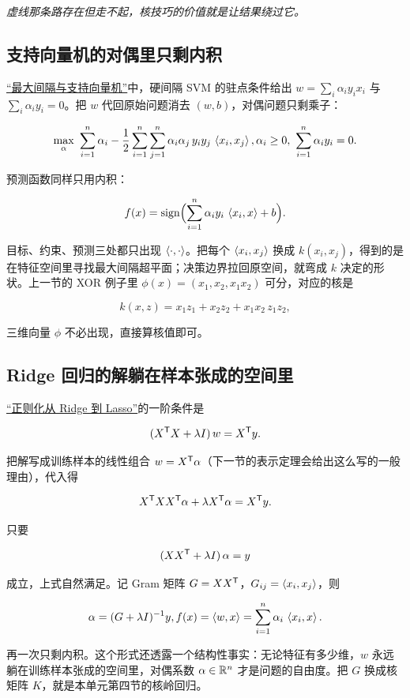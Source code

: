 \emph{虚线那条路存在但走不起，核技巧的价值就是让结果绕过它。}

\subsection{支持向量机的对偶里只剩内积}

\hyperref[sec:09-Convex-Optimization/07-Applications/03]{``最大间隔与支持向量机''}中，硬间隔 SVM 的驻点条件给出 \(w=\sum_i\alpha_iy_ix_i\) 与 \(\sum_i\alpha_iy_i=0\)。把 \(w\) 代回原始问题消去 \((w,b)\)，对偶问题只剩乘子：

\[
\max_{\alpha}\ \sum_{i=1}^{n}\alpha_i
-\frac12\sum_{i=1}^{n}\sum_{j=1}^{n}
\alpha_i\alpha_j\,y_iy_j\,\left\langle x_i,x_j\right\rangle,
\space
\alpha_i\ge0,\ \sum_{i=1}^{n}\alpha_iy_i=0.
\]

预测函数同样只用内积：

\[
f(x)=\operatorname{sign}\Bigl(\sum_{i=1}^{n}\alpha_iy_i\,\left\langle x_i,x\right\rangle+b\Bigr).
\]

目标、约束、预测三处都只出现 \(\left\langle\cdot,\cdot\right\rangle\)。把每个 \(\left\langle x_i,x_j\right\rangle\) 换成 \(k(x_i,x_j)\)，得到的是在特征空间里寻找最大间隔超平面；决策边界拉回原空间，就弯成 \(k\) 决定的形状。上一节的 XOR 例子里 \(\phi(x)=(x_1,x_2,x_1x_2)\) 可分，对应的核是

\[
k(x,z)=x_1z_1+x_2z_2+x_1x_2\,z_1z_2,
\]

三维向量 \(\phi\) 不必出现，直接算核值即可。

\subsection{Ridge 回归的解躺在样本张成的空间里}

\hyperref[sec:13-Machine-Learning/02-Linear-Models/02]{``正则化从 Ridge 到 Lasso''}的一阶条件是

\[
(X^{\mathsf{T}}X+\lambda I)\,w=X^{\mathsf{T}}y.
\]

把解写成训练样本的线性组合 \(w=X^{\mathsf{T}}\alpha\)（下一节的表示定理会给出这么写的一般理由），代入得

\[
X^{\mathsf{T}}XX^{\mathsf{T}}\alpha+\lambda X^{\mathsf{T}}\alpha=X^{\mathsf{T}}y.
\]

只要

\[
(XX^{\mathsf{T}}+\lambda I)\,\alpha=y
\]

成立，上式自然满足。记 Gram 矩阵 \(G=XX^{\mathsf{T}}\)，\(G_{ij}=\left\langle x_i,x_j\right\rangle\)，则

\[
\alpha=(G+\lambda I)^{-1}y,
\space
f(x)=\left\langle w,x\right\rangle=\sum_{i=1}^{n}\alpha_i\,\left\langle x_i,x\right\rangle.
\]

再一次只剩内积。这个形式还透露一个结构性事实：无论特征有多少维，\(w\) 永远躺在训练样本张成的空间里，对偶系数 \(\alpha\in\mathbb{R}^n\) 才是问题的自由度。把 \(G\) 换成核矩阵 \(K\)，就是本单元第四节的核岭回归。

